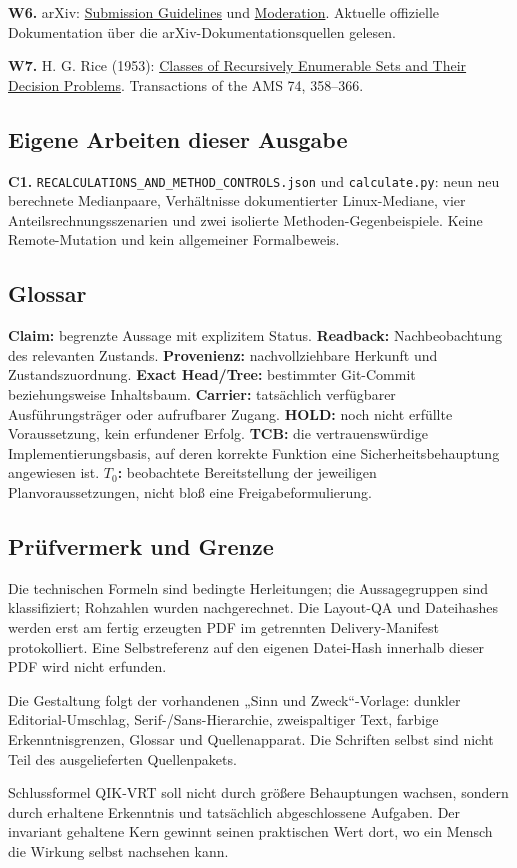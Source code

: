 \begin{cols}
\textbf{W6.} arXiv: \href{https://info.arxiv.org/help/submit/index.html}{Submission Guidelines} und \href{https://info.arxiv.org/help/moderation/index.html}{Moderation}. Aktuelle offizielle Dokumentation über die arXiv-Dokumentationsquellen gelesen.

\textbf{W7.} H. G. Rice (1953): \href{https://www.ams.org/journals/tran/1953-074-02/S0002-9947-1953-0053041-6/S0002-9947-1953-0053041-6.pdf}{Classes of Recursively Enumerable Sets and Their Decision Problems}. Transactions of the AMS 74, 358–366.

\subsection*{Eigene Arbeiten dieser Ausgabe}
\textbf{C1.} \texttt{RECALCULATIONS\_AND\_METHOD\_CONTROLS.json} und \texttt{calculate.py}: neun neu berechnete Medianpaare, Verhältnisse dokumentierter Linux-Mediane, vier Anteilsrechnungsszenarien und zwei isolierte Methoden-Gegenbeispiele. Keine Remote-Mutation und kein allgemeiner Formalbeweis.

\subsection*{Glossar}
\textbf{Claim:} begrenzte Aussage mit explizitem Status. \textbf{Readback:} Nachbeobachtung des relevanten Zustands. \textbf{Provenienz:} nachvollziehbare Herkunft und Zustandszuordnung. \textbf{Exact Head/Tree:} bestimmter Git-Commit beziehungsweise Inhaltsbaum. \textbf{Carrier:} tatsächlich verfügbarer Ausführungsträger oder aufrufbarer Zugang. \textbf{HOLD:} noch nicht erfüllte Voraussetzung, kein erfundener Erfolg. \textbf{TCB:} die vertrauenswürdige Implementierungsbasis, auf deren korrekte Funktion eine Sicherheitsbehauptung angewiesen ist. \textbf{$T_0$:} beobachtete Bereitstellung der jeweiligen Planvoraussetzungen, nicht bloß eine Freigabeformulierung.

\subsection*{Prüfvermerk und Grenze}
Die technischen Formeln sind bedingte Herleitungen; die Aussagegruppen sind klassifiziert; Rohzahlen wurden nachgerechnet. Die Layout-QA und Dateihashes werden erst am fertig erzeugten PDF im getrennten Delivery-Manifest protokolliert. Eine Selbstreferenz auf den eigenen Datei-Hash innerhalb dieser PDF wird nicht erfunden.

Die Gestaltung folgt der vorhandenen „Sinn und Zweck“-Vorlage: dunkler Editorial-Umschlag, Serif-/Sans-Hierarchie, zweispaltiger Text, farbige Erkenntnisgrenzen, Glossar und Quellenapparat. Die Schriften selbst sind nicht Teil des ausgelieferten Quellenpakets.

\begin{boundary}{Schlussformel}
QIK-VRT soll nicht durch größere Behauptungen wachsen, sondern durch erhaltene Erkenntnis und tatsächlich abgeschlossene Aufgaben. Der invariant gehaltene Kern gewinnt seinen praktischen Wert dort, wo ein Mensch die Wirkung selbst nachsehen kann.
\end{boundary}
\end{cols}
